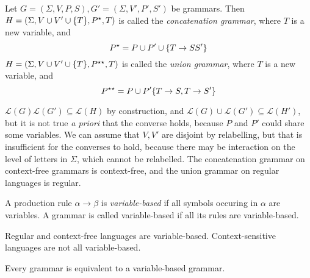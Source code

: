 \begin{definition}
	Let \( G = (\Sigma, V, P, S), G' = (\Sigma, V', P', S') \) be grammars.
	Then \( H = (\Sigma, V \cup V' \cup \qty{T}, P^\star, T) \) is called the \emph{concatenation grammar}, where \( T \) is a new variable, and
	\[ P^\star = P \cup P' \cup \qty{T \to SS'} \]
	\( H = (\Sigma, V \cup V' \cup \qty{T}, P^{\star\star}, T) \) is called the \emph{union grammar}, where \( T \) is a new variable, and
	\[ P^{\star\star} = P \cup P' \qty{T \to S, T \to S'} \]
\end{definition}
\begin{remark}
	\( \mathcal L(G)\mathcal L(G') \subseteq \mathcal L(H) \) by construction, and \( \mathcal L(G) \cup \mathcal L(G') \subseteq \mathcal L(H') \), but it is not true \emph{a priori} that the converse holds, because \( P \) and \( P' \) could share some variables.
	We can assume that \( V, V' \) are disjoint by relabelling, but that is insufficient for the converses to hold, because there may be interaction on the level of letters in \( \Sigma \), which cannot be relabelled.
	The concatenation grammar on context-free grammars is context-free, and the union grammar on regular languages is regular.
\end{remark}
\begin{definition}
	A production rule \( \alpha \to \beta \) is \emph{variable-based} if all symbols occuring in \( \alpha \) are variables.
	A grammar is called variable-based if all its rules are variable-based.
\end{definition}
\begin{remark}
	Regular and context-free languages are variable-based.
	Context-sensitive languages are not all variable-based.
\end{remark}
\begin{lemma}
	Every grammar is equivalent to a variable-based grammar.
\end{lemma}
